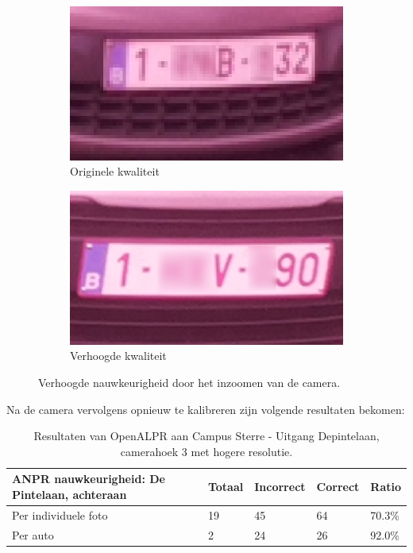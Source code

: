 \begin{figure}[h!]
	\centering
	\begin{subfigure}[b]{0.49\linewidth}
		\includegraphics[width=\linewidth]{img/sterachter/sterachter2.png}
		\caption{Originele kwaliteit}
	\end{subfigure}
	\begin{subfigure}[b]{0.49\linewidth}
		\includegraphics[width=\linewidth]{img/sterachter/hressmall2.png}
		\caption{Verhoogde kwaliteit}
	\end{subfigure}
	\caption{Verhoogde nauwkeurigheid door het inzoomen van de camera.}
	\label{fig:ressterrecomparison}
\end{figure}

Na de camera vervolgens opnieuw te kalibreren zijn volgende resultaten bekomen:
\begin{table}[h!]
	\centering
	\begin{tabular}{l|l|l|l|l}
		\textbf{ANPR nauwkeurigheid: De Pintelaan, achteraan} & Totaal & Incorrect & Correct & Ratio	\\ \hline
		Per individuele foto 	& 19 & 45	& 64	& 70.3\%\\
		Per auto				& 2 & 24	& 26 	& 92.0\%\\
	\end{tabular}
\caption{Resultaten van OpenALPR aan Campus Sterre - Uitgang Depintelaan, camerahoek 3 met hogere resolutie.}
\label{tab:alprdepintelaan4}
\end{table}

